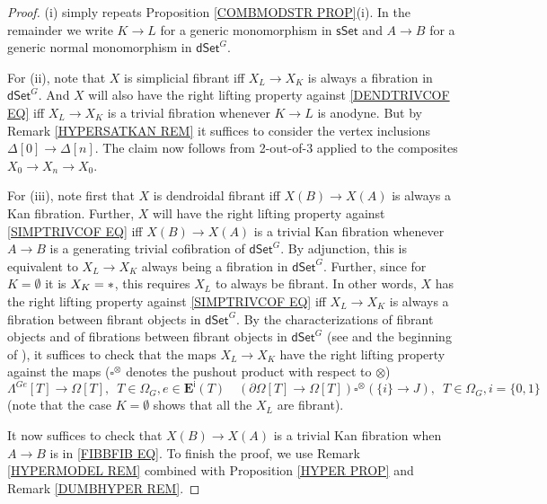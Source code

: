 \documentclass[a4paper,10pt
 ,draft
]{article}%
\begin{document}
\begin{proof}
(i) simply repeats Proposition \ref{COMBMODSTR PROP}(i). In the remainder we write $K \to L$ for a generic monomorphism in 
$\mathsf{sSet}$
and $A \to B$ for a generic normal monomorphism in $\mathsf{dSet}^G$.


For (ii), note that $X$ is simplicial fibrant iff 
$X_L \to X_K$ is always a fibration in $\mathsf{dSet}^G$. 
And $X$ will also have the right lifting property against \eqref{DENDTRIVCOF EQ} iff 
$X_L \to X_K$ is a trivial fibration whenever $K \to L$ is anodyne. But by Remark \ref{HYPERSATKAN REM}
it suffices to consider the vertex inclusions $\Delta[0] \to \Delta[n]$.
The claim now follows from 2-out-of-3 applied to the composites $X_0 \to X_n \to X_0$.


For (iii), note first that $X$ is dendroidal fibrant iff $X(B) \to X(A)$ is always a Kan fibration.
Further, $X$ will have the right lifting property against \eqref{SIMPTRIVCOF EQ} iff 
$X(B) \to X(A)$ is a trivial Kan fibration whenever $A\to B$ is a generating trivial cofibration of $\mathsf{dSet}^G$.
By adjunction, this is equivalent to 
$X_L \to X_K$ always being a fibration in $\mathsf{dSet}^G$.
Further, since for $K=\emptyset$ it is $X_{K}=\**$, this requires $X_L$ to always be fibrant. In other words, $X$ has the right lifting property against \eqref{SIMPTRIVCOF EQ} iff
$X_L \to X_K$ is always a fibration between fibrant objects in $\mathsf{dSet}^G$.
By the characterizations of fibrant objects and of fibrations between fibrant objects in $\mathsf{dSet}^G$ (see \cite[Prop. 8.8]{Per18} and the beginning of \cite[\S 8.1]{Per18}), it suffices to check that the maps $X_L \to X_K$ have the right lifting property against the maps 
($\square^{\otimes}$ denotes the pushout product with respect to
$\otimes$)
\begin{equation}\label{FIBBFIB EQ}
	\Lambda^{G e} [T] \to \Omega[T],
	\phantom{1}
	T \in \Omega_G, e \in \boldsymbol{E}^{\mathsf{i}}(T)
\quad
	\left( \partial\Omega[T] \to \Omega[T]\right) \square^{\otimes} \left( \{i\} \to J\right),
	\phantom{1}
	T \in \Omega_G, i = \{0,1\}
\end{equation}
(note that the case $K=\emptyset$ shows that all the $X_L$ are fibrant).

 
 It now suffices to check that $X(B) \to X(A)$ is a trivial Kan fibration when $A\to B$ is in \eqref{FIBBFIB EQ}.
To finish the proof, we use Remark \ref{HYPERMODEL REM}
combined with Proposition \ref{HYPER PROP}
and Remark \ref{DUMBHYPER REM}.
%
\end{proof}
\end{document}
